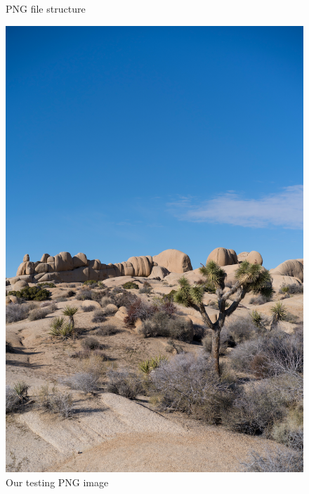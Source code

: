 \documentclass{article}
\begin{document}
\begin{figure}[htb]
\begin{minipage}[b]{0.3\textwidth}
        \caption{PNG file structure}
    \label{fig:png-structure}
    \end{minipage}
    \hfill
    \begin{minipage}[b]{0.36\textwidth}
        \includegraphics[width=\textwidth]{../Resource/image.png}
        \caption{Our testing PNG image}
    \label{fig:our-image}
    \end{minipage}
    \hfill
\end{figure}
\end{document}

